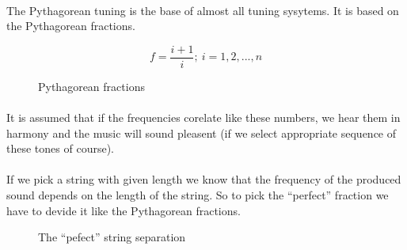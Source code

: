 \documentclass[]{article}
\begin{document}
            \paragraph{} The Pythagorean tuning is the base of almost all tuning sysytems. It is based on the Pythagorean fractions.\\
                \begin{figure}[h]
                    $$f = \frac{i + 1}{i} ;\ i = 1, 2, ..., n$$
                    \caption{Pythagorean fractions}
                \end{figure}\paragraph{}
                It is assumed that if the frequencies corelate like these numbers, we hear them in harmony and the music will sound pleasent (if we select appropriate sequence of these tones of course).\paragraph{}
                If we pick a string with given length we know that the frequency of the produced sound depends on the length of the string. So to pick the ``perfect'' fraction we have to devide it like the Pythagorean fractions.
                \begin{figure}[h]
                    \begin{center}
                        \caption{The ``pefect'' string separation}            
                    \end{center}
                \end{figure}
\end{document}
